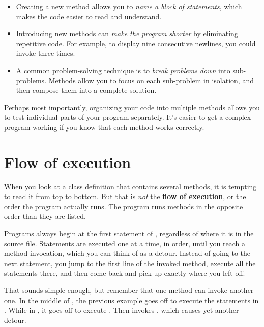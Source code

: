 \begin{itemize}

\item Creating a new method allows you to {\em name a block of statements}, which makes the code easier to read and understand.

\item Introducing new methods can {\em make the program shorter} by eliminating repetitive code.
For example, to display nine consecutive newlines, you could invoke  three times.

\item A common problem-solving technique is to {\em break problems down} into sub-problems.
Methods allow you to focus on each sub-problem in isolation, and then compose them into a complete solution.

\end{itemize}

Perhaps most importantly, organizing your code into multiple methods allows you to test individual parts of your program separately.
It's easier to get a complex program working if you know that each method works correctly.


\section{Flow of execution}

When you look at a class definition that contains several methods, it is tempting to read it from top to bottom.
But that is {\em not} the {\bf flow of execution}, or the order the program actually runs.
The  program runs methods in the opposite order than they are listed.

Programs always begin at the first statement of , regardless of where it is in the source file.
Statements are executed one at a time, in order, until you reach a method invocation, which you can think of as a detour.
Instead of going to the next statement, you jump to the first line of the invoked method, execute all the statements there, and then come back and pick up exactly where you left off.

That sounds simple enough, but remember that one method can invoke another one.
In the middle of , the previous example goes off to execute the statements in .
While in , it goes off to execute .
Then  invokes , which causes yet another detour.

